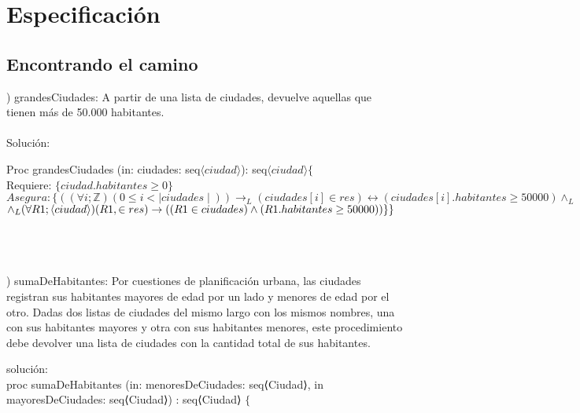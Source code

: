 \documentclass[10pt,a4paper]{article}
\begin{document}
\maketitle

\section{Especificación}
\subsection{Encontrando el camino}


\begin{questions}

    ) grandesCiudades: A partir de una lista de ciudades, devuelve aquellas que tienen más de 50.000 habitantes. \\ \\
Solución:    \\
    \begin{solution}
        Proc  grandesCiudades (in: ciudades: seq$\langle ciudad \rangle$): seq$\langle ciudad \rangle \lbrace$ \\ 
        Requiere: $\lbrace ciudad.habitantes \geq 0 \rbrace $\\
        $Asegura: \lbrace((\forall i; \mathbb{Z})(0 \leq i  < \mid ciudades \mid)) \rightarrow _L (ciudades[i] \in res) \leftrightarrow (ciudades[i].habitantes \geq 50000) \wedge _L $ \\ $\wedge _L(\forall R1;\langle ciudad \rangle) (R1, \in res)  \rightarrow((R1 \in  ciudades) \wedge (R1.habitantes \geq 50000))\rbrace \\ \rbrace$
    \end{solution}
    \\\\\\
    ) sumaDeHabitantes: Por cuestiones de planificación urbana, las ciudades registran sus habitantes mayores de edad por un lado y menores de edad por el otro. Dadas dos listas de ciudades del mismo largo con los mismos nombres, una con sus habitantes mayores y otra con sus habitantes menores, este procedimiento debe devolver una lista de ciudades con la cantidad total de sus habitantes. \\ 
    \begin{solution}
    solución: \\
        proc sumaDeHabitantes (in: menoresDeCiudades: seq⟨Ciudad⟩, in mayoresDeCiudades: seq⟨Ciudad⟩) : seq⟨Ciudad⟩ $\lbrace$ \\

\end{solution}
\end{questions}
\end{document}
